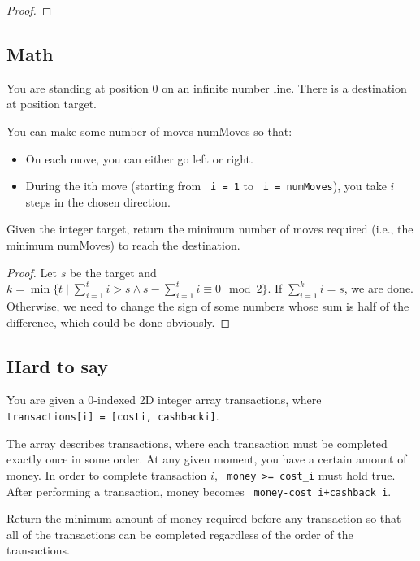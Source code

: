 \documentclass[11pt]{article}
\let\OldTexttt\texttt
\renewcommand{\texttt}[1]{\OldTexttt{\color{MidnightBlue} #1}}
\begin{document}
\begin{proof}

\end{proof}

\subsection{Math}
\label{sec:org97e4f13}
\begin{problem}
You are standing at position 0 on an infinite number line. There is a destination at position
target.

You can make some number of moves numMoves so that:
\begin{itemize}
\item On each move, you can either go left or right.
\item During the ith move (starting from \texttt{i = 1} to \texttt{i = numMoves}), you take \(i\) steps in the chosen direction.
\end{itemize}
Given the integer target, return the minimum number of moves required (i.e., the minimum
numMoves) to reach the destination.
\end{problem}

\begin{proof}
Let \(s\) be the target and  \(k=\min\{t\mid\sum_{i=1}^ti>s\wedge s-\sum_{i=1}^ti\equiv 0\mod 2\}\). If \(\sum_{i=1}^ki=s\), we are done.
Otherwise, we need to change the sign of some numbers whose sum is half of the difference, which
could be done obviously.
\end{proof}

\subsection{Hard to say}
\label{sec:orga46f21d}
\begin{problem}
You are given a 0-indexed 2D integer array transactions, where \texttt{transactions[i] = [costi, cashbacki]}.

The array describes transactions, where each transaction must be completed exactly once in some
order. At any given moment, you have a certain amount of money. In order to complete transaction
\(i\), \texttt{money >= cost\_i} must hold true. After performing a transaction, money becomes \texttt{money-cost\_i+cashback\_i}.

Return the minimum amount of money required before any transaction so that all of the
transactions can be completed regardless of the order of the transactions.
\end{problem}
\end{document}
